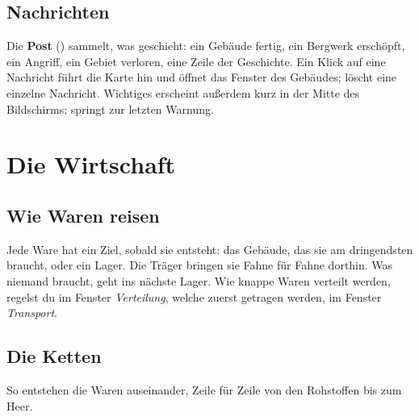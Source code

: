 \documentclass[a4paper,11pt,oneside,DIV=12,headings=small,toc=chapterentrydotfill]{scrbook}
\begin{document}
\section{Nachrichten}
Die \textbf{Post} () sammelt, was geschieht: ein Gebäude fertig, ein Bergwerk erschöpft, ein Angriff, ein
Gebiet verloren, eine Zeile der Geschichte. Ein Klick auf eine Nachricht führt die Karte hin und öffnet das
Fenster des Gebäudes;  löscht eine einzelne Nachricht. Wichtiges erscheint außerdem kurz in der Mitte
des Bildschirms;  springt zur letzten Warnung.

\chapter{Die Wirtschaft}

\section{Wie Waren reisen}
Jede Ware hat ein Ziel, sobald sie entsteht: das Gebäude, das sie am dringendsten braucht, oder ein Lager.
Die Träger bringen sie Fahne für Fahne dorthin. Was niemand braucht, geht ins nächste Lager. Wie knappe Waren
verteilt werden, regelst du im Fenster \emph{Verteilung}, welche zuerst getragen werden, im Fenster
\emph{Transport}.

\section{Die Ketten}
So entstehen die Waren auseinander, Zeile für Zeile von den Rohstoffen bis zum Heer.
\end{document}
